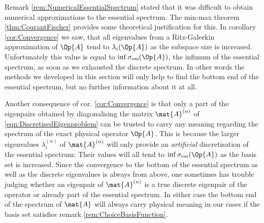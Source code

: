 \begin{rem}
Remark \vref{rem:NumericalEssentialSpectrum}
stated that it was difficult
to obtain numerical approximations to the essential spectrum.
The min-max theorem \vref{thm:CourantFischer}
provides some theoretical justification for this.
In corollary \vref{cor:Convergence} we saw,
that all eigenvalues from a Ritz-Galerkin approximation
of $\Op{A}$ tend to $\lambda_i(\Op{A})$
as the subspace size is increased.
Unfortunately this value is equal to $\inf \sigma_\text{ess}(\Op{A})$,
the infimum of the essential spectrum,
as soon as we exhausted the discrete spectrum.
In other words the methods we developed in this section
will only help to find the bottom end of the essential spectrum,
but no further information about it at all.

Another consequence of cor. \ref{cor:Convergence} is
that only a part of the eigenpairs obtained by
diagonalising the matrix $\mat{A}^{(n)}$ of \vref{eqn:DiscretisedEigenproblem}
can be trusted to carry any meaning regarding
the spectrum of the exact physical operator $\Op{A}$.
This is because the larger eigenvalues $\lambda_i^{(n)}$
of $\mat{A}^{(n)}$ will only provide an \emph{artificial}
discretisation of the essential spectrum:
Their values will all tend to $\inf \sigma_\text{ess}(\Op{A})$
as the basis set is increased.
Since the convergence to the bottom of the essential spectrum
as well as the discrete eigenvalues is always from above,
one sometimes has trouble judging whether
an eigenpair of $\mat{A}^{(n)}$
is a true discrete eigenpair of the operator or already
part of the essential spectrum.
In either case the bottom end of the spectrum of $\mat{A}$
will always carry physical meaning in our cases if the basis
set satisfies remark \vref{rem:ChoiceBasisFunction}.
\end{rem}

